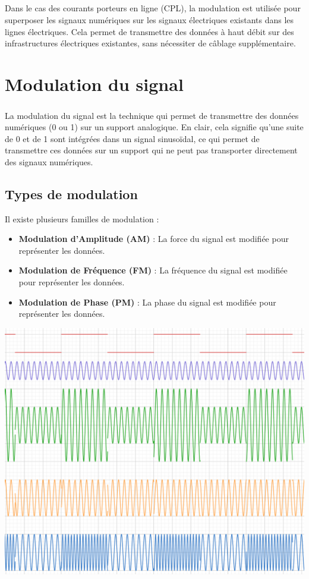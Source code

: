 \documentclass[a4paper,draft,twocolumn]{report}
\begin{document}
\paragraph{}Dans le cas des courants porteurs en ligne (CPL), la modulation est utilisée pour superposer les signaux numériques sur les signaux électriques existants dans les lignes électriques. Cela permet de transmettre des données à haut débit sur des infrastructures électriques existantes, sans nécessiter de câblage supplémentaire.
\chapter{Modulation du signal}

\paragraph{}La modulation du signal est la technique qui permet de transmettre des données numériques (0 ou 1) sur un support analogique. En clair, cela signifie qu'une suite de 0 et de 1 sont intégrées dans un signal sinusoïdal, ce qui permet de transmettre ces données sur un support qui ne peut pas transporter directement des signaux numériques. 

\section{Types de modulation}
Il existe plusieurs familles de modulation :
\begin{itemize}
    \item \textbf{Modulation d'Amplitude (AM)} : La force du signal est modifiée pour représenter les données.
    \item \textbf{Modulation de Fréquence (FM)} : La fréquence du signal est modifiée pour représenter les données.
    \item \textbf{Modulation de Phase (PM)} : La phase du signal est modifiée pour représenter les données.
\end{itemize}

\includegraphics[scale=0.35]{images/ModulationExemple.png}
\end{document}
